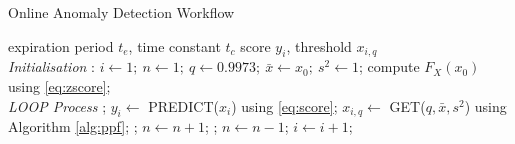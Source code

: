 \begin{algorithm}[H]
\caption{{Online Anomaly Detection Workflow}} \label{alg:detector}
 \begin{algorithmic}[1]
  \renewcommand{\algorithmicrequire}{\textbf{Input:}}
  \renewcommand{\algorithmicensure}{\textbf{Output:}}
  \REQUIRE expiration period $t_e$, time constant $t_c$
  \ENSURE  score $y_i$, threshold $x_{i,q}$
 \\ \textit{Initialisation} :
  \STATE $i \leftarrow 1;~ n \leftarrow 1;~ q \leftarrow 0.9973;~ \bar x  \leftarrow x_0;~  s^2 \leftarrow 1$;
  \STATE compute $F_X(x_0)$ using \eqref{eq:zscore};
 \\ \textit{LOOP Process}
  \LOOP
    ;
    \STATE $y_i \leftarrow$ PREDICT($x_i$) using \eqref{eq:score};
    \STATE $x_{i,q} \leftarrow$ GET($q, \bar x, s^2$) using Algorithm \ref{alg:ppf};
    \IF {\eqref{eq:score_norm} \OR \eqref{eq:condition}}
     ;
     \STATE $n \leftarrow n + 1$;
      ;
      \STATE $n \leftarrow n - 1$;
     \ENDFOR
    \ENDIF
    \STATE $i \leftarrow i + 1$;
  \ENDLOOP
 \end{algorithmic}
\end{algorithm}
